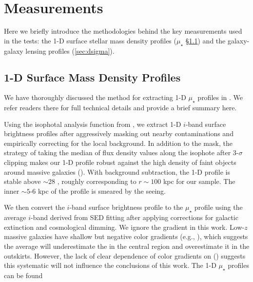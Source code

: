 \documentclass[fleqn,usenatbib,useAMS,english]{mnras}
\begin{document}
\section{Measurements}
    \label{sec:measure}

    Here we briefly introduce the methodologies behind the key measurements used in the \topn{}
    tests: the 1-D surface stellar mass density profiles ($\mu_{\star}$ \S \ref{sec:1d_prof}) and
    the galaxy-galaxy lensing \dsigma{} profiles (\ref{sec:dsigma}).

\subsection{1-D Surface Mass Density Profiles}
    \label{sec:1d_prof}

    We have thoroughly discussed the method for extracting 1-D $\mu_{\star}$ profiles in
    \citet{Huang2018b, Huang2018c, Ardila2021}.
    We refer readers there for full technical details and provide a brief summary here.

    Using the \ellipse{} isophotal analysis function from \iraf{}, we extract 1-D $i$-band
    surface brightness profiles after aggressively masking out nearby contaminations and
    empirically correcting for the local background.
    In addition to the mask, the strategy of taking the median of flux density values along
    the isophote after 3-$\sigma$ clipping makes our 1-D profile robust against the high
    density of faint objects around massive galaxies (\citealt{Ardila2021}).
    With background subtraction, the 1-D profile is stable above $\sim 28$ \sb{},
    roughly corresponding to $r\sim 100$ kpc for our sample.
    The inner $\sim 5$-6 kpc of the profile is smeared by the seeing.

    We then convert the $i$-band surface brightness profile to the $\mu_{\star}$ profile using the
    average $i$-band \mlratio{} derived from SED fitting after applying corrections for
    galactic extinction and cosmological dimming.
    We ignore the \mlratio{} gradient in this work.
    Low-$z$ massive galaxies have shallow but negative color gradients
    (e.g., \citealt{Huang2018b, Wang2019, Montes2021}), which suggests
    the average \mlratio{} will underestimate the \mstar{} in the central region
    and overestimate it in the outskirts.
    However, the lack of clear dependence of color gradients on \mstar{} (\citealt{Huang2018b})
    suggests this systematic will not influence the conclusions of this work.
    The 1-D $\mu_{\star}$ profiles can be found 
\end{document}
